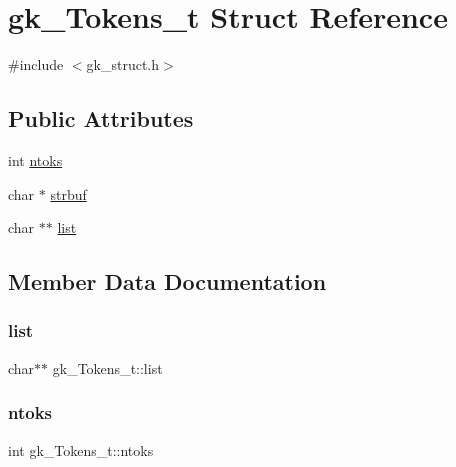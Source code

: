 \hypertarget{a00654}{}\section{gk\+\_\+\+Tokens\+\_\+t Struct Reference}
\label{a00654}


{\ttfamily \#include $<$gk\+\_\+struct.\+h$>$}

\subsection*{Public Attributes}
\begin{DoxyCompactItemize}
\item 
int \hyperlink{a00654_a9a6e215f177a16bc5852abd3953fa12e}{ntoks}
\item 
char $\ast$ \hyperlink{a00654_a2770337d903acb342ec9540882b53601}{strbuf}
\item 
char $\ast$$\ast$ \hyperlink{a00654_a3e5376a3057dc7102615daa0dcbd44f8}{list}
\end{DoxyCompactItemize}


\subsection{Member Data Documentation}
\mbox{\label{a00654_a3e5376a3057dc7102615daa0dcbd44f8}} 
\subsubsection{\texorpdfstring{list}{list}}
{\footnotesize\ttfamily char$\ast$$\ast$ gk\+\_\+\+Tokens\+\_\+t\+::list}

\mbox{\label{a00654_a9a6e215f177a16bc5852abd3953fa12e}} 
\subsubsection{\texorpdfstring{ntoks}{ntoks}}
{\footnotesize\ttfamily int gk\+\_\+\+Tokens\+\_\+t\+::ntoks}

\mbox{\label{a00654_a2770337d903acb342ec9540882b53601}} 
